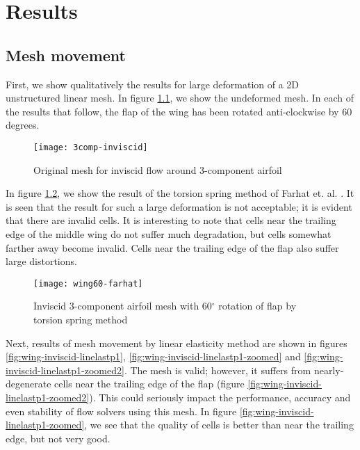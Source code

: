 \chapter{Results}
 
\section{Mesh movement}
 
First, we show qualitatively the results for large deformation of a 2D unstructured linear mesh. In figure \ref{fig:wing-inviscid}, we show the undeformed mesh. In each of the results that follow, the flap of the wing has been rotated anti-clockwise by 60 degrees.
\begin{figure}
  	\centering
  	\texttt{[image: 3comp-inviscid]}
  	\caption{Original mesh for inviscid flow around 3-component airfoil}
  	\label{fig:wing-inviscid}
\end{figure}

In figure \ref{fig:wing-inviscid-farhat}, we show the result of the torsion spring method of Farhat et. al. \cite{mm:torsionsprings}. It is seen that the result for such a large deformation is not acceptable; it is evident that there are invalid cells. It is interesting to note that cells near the trailing edge of the middle wing do not suffer much degradation, but cells somewhat farther away become invalid. Cells near the trailing edge of the flap also suffer large distortions.

\begin{figure}[!h]
	\centering
	\texttt{[image: wing60-farhat]}
	\caption{Inviscid 3-component airfoil mesh with 60$^\circ$ rotation of flap by torsion spring method}
	\label{fig:wing-inviscid-farhat}
\end{figure}

Next, results of mesh movement by linear elasticity method are shown in figures \ref{fig:wing-inviscid-linelastp1}, \ref{fig:wing-inviscid-linelastp1-zoomed} and \ref{fig:wing-inviscid-linelastp1-zoomed2}. The mesh is valid; however, it suffers from nearly-degenerate cells near the trailing edge of the flap (figure  \ref{fig:wing-inviscid-linelastp1-zoomed2}). This could seriously impact the performance, accuracy and even stability of flow solvers using this mesh. In figure \ref{fig:wing-inviscid-linelastp1-zoomed}, we  see that the quality of cells is better than near the trailing edge, but not very good.

